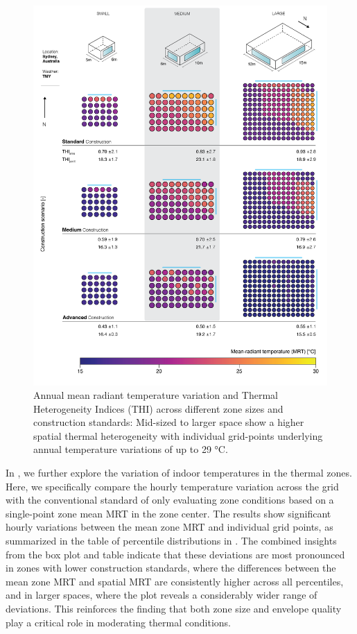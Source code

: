 \begin{figure}[H]
    \centering
    \includegraphics[width=\textwidth]{manuscript/src/figures/heterogeneity-mapping-tmy.png}
    \caption{Annual mean radiant temperature variation and Thermal Heterogeneity Indices (THI) across different zone sizes and construction standards: Mid-sized to larger space show a higher spatial thermal heterogeneity with individual grid-points underlying annual temperature variations of up to 29 °C.}
    \label{fig:heterogeneity-mapping-tmy}
\end{figure}


In , we further explore the variation of indoor temperatures in the thermal zones. Here, we specifically compare the hourly temperature variation across the grid with the conventional standard of only evaluating zone conditions based on a single-point zone mean MRT in the zone center. The results show significant hourly variations between the mean zone MRT and individual grid points, as summarized in the table of percentile distributions in . The combined insights from the box plot and table indicate that these deviations are most pronounced in zones with lower construction standards, where the differences between the mean zone MRT and spatial MRT are consistently higher across all percentiles, and in larger spaces, where the plot reveals a considerably wider range of deviations. This reinforces the finding that both zone size and envelope quality play a critical role in moderating thermal conditions.


